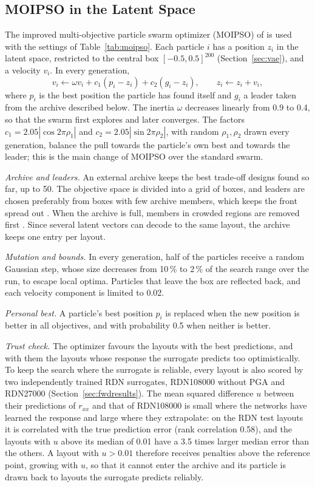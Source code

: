 \subsection{MOIPSO in the Latent Space}
The improved multi-objective particle swarm optimizer (MOIPSO) of \cite{moipso} is used with the settings of Table~\ref{tab:moipso}. Each particle $i$ has a position $z_i$ in the latent space, restricted to the central box $[-0.5,0.5]^{200}$ (Section~\ref{sec:vae}), and a velocity $v_i$. In every generation,
\begin{equation}
v_i\leftarrow\omega v_i+c_1(p_i-z_i)+c_2(g_i-z_i),\qquad z_i\leftarrow z_i+v_i ,
\end{equation}
where $p_i$ is the best position the particle has found itself and $g_i$ a leader taken from the archive described below. The inertia $\omega$ decreases linearly from 0.9 to 0.4, so that the swarm first explores and later converges. The factors $c_1=2.05|\cos2\pi\rho_1|$ and $c_2=2.05|\sin2\pi\rho_2|$, with random $\rho_1,\rho_2$ drawn every generation, balance the pull towards the particle's own best and towards the leader; this is the main change of MOIPSO over the standard swarm.

\emph{Archive and leaders.} An external archive keeps the best trade-off designs found so far, up to 50. The objective space is divided into a grid of boxes, and leaders are chosen preferably from boxes with few archive members, which keeps the front spread out \cite{mopso}. When the archive is full, members in crowded regions are removed first \cite{nsga2}. Since several latent vectors can decode to the same layout, the archive keeps one entry per layout.

\emph{Mutation and bounds.} In every generation, half of the particles receive a random Gaussian step, whose size decreases from 10\,\% to 2\,\% of the search range over the run, to escape local optima. Particles that leave the box are reflected back, and each velocity component is limited to 0.02.

\emph{Personal best.} A particle's best position $p_i$ is replaced when the new position is better in all objectives, and with probability 0.5 when neither is better.

\emph{Trust check.} The optimizer favours the layouts with the best predictions, and with them the layouts whose response the surrogate predicts too optimistically. To keep the search where the surrogate is reliable, every layout is also scored by two independently trained RDN surrogates, RDN108000 without PGA and RDN27000 (Section~\ref{sec:fwdresults}). The mean squared difference $u$ between their predictions of $r_{xx}$ and that of RDN108000 is small where the networks have learned the response and large where they extrapolate: on the RDN test layouts it is correlated with the true prediction error (rank correlation 0.58), and the layouts with $u$ above its median of 0.01 have a 3.5 times larger median error than the others. A layout with $u>0.01$ therefore receives penalties above the reference point, growing with $u$, so that it cannot enter the archive and its particle is drawn back to layouts the surrogate predicts reliably.

